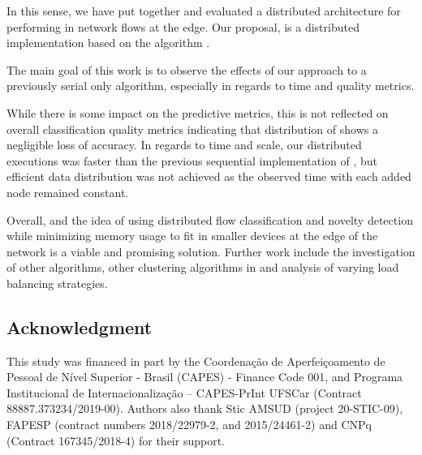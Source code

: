 In this sense, we have put together and evaluated a distributed architecture for performing \nd in network flows at the edge.
Our proposal, \mfog is a distributed \nd
implementation based on the \nd algorithm \minas.

The main goal of this work is to observe the effects of our approach to a
previously serial only algorithm, especially in regards to time and quality
metrics.

While there is some impact on the predictive metrics, this is not reflected on
overall classification quality metrics indicating that distribution of \minas
shows a negligible loss of accuracy.
In regards to time and scale, our distributed executions was faster than the 
previous sequential implementation of \minas, but efficient data distribution was not achieved as the
observed time with each added node remained constant.

Overall, \mfog and the idea of using distributed flow classification and novelty
detection while minimizing memory usage to fit in smaller devices at the edge of
the network is a viable and promising solution.
Further work include the investigation of other \nd algorithms, other clustering
algorithms in \minas and analysis of varying load balancing strategies.

\subsection*{Acknowledgment}

This study was financed in part by the Coordenação de Aperfeiçoamento de Pessoal
de Nível Superior - Brasil (CAPES) - Finance Code 001, and Programa
Institucional de Internacionalização – CAPES-PrInt UFSCar (Contract
88887.373234/2019-00). Authors also thank Stic AMSUD (project 20-STIC-09),
FAPESP (contract numbers 2018/22979-2, and 2015/24461-2) and CNPq (Contract
167345/2018-4) for their support.
